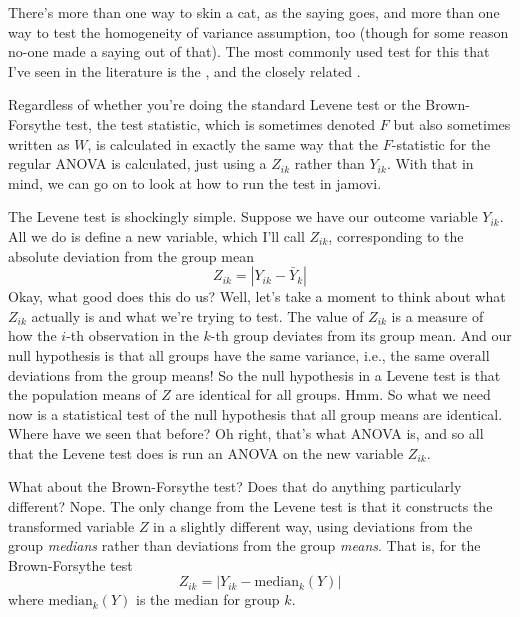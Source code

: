 There's more than one way to skin a cat, as the saying goes, and more than one way to test the homogeneity of variance assumption, too (though for some reason no-one made a saying out of that). The most commonly used test for this that I've seen in the literature is the  \parencite{Levene1960}, and the closely related  \parencite{BrownForsythe1974}. 

Regardless of whether you're doing the standard Levene test or the Brown-Forsythe test, the test statistic, which is sometimes denoted $F$ but also sometimes written as $W$, is  calculated in exactly the same way that the $F$-statistic for the regular ANOVA is calculated, just using a $Z_{ik}$ rather than $Y_{ik}$. With that in mind, we can go on to look at how to run the test in jamovi.

\vspace{0.5cm}
\begin{mdframed}[style=MyFrame,nobreak=false]
The Levene test is shockingly simple. Suppose we have our outcome variable $Y_{ik}$. All we do is define a new variable, which I'll call $Z_{ik}$, corresponding to the absolute deviation from the group mean
$$
Z_{ik} = \left| Y_{ik} - \bar{Y}_k \right|
$$
Okay, what good does this do us? Well, let's take a moment to think about what $Z_{ik}$ actually is and what we're trying to test. The value of $Z_{ik}$ is a measure of how the $i$-th observation in the $k$-th group deviates from its group mean. And our null hypothesis is that all groups have the same variance, i.e., the same overall deviations from the group means! So the null hypothesis in a Levene test is that the population means of $Z$ are identical for all groups. Hmm. So what we need now is a statistical test of the null hypothesis that all group means are identical. Where have we seen that before? Oh right, that's what ANOVA is, and so all that the Levene test does is run an ANOVA on the new variable $Z_{ik}$. 

What about the Brown-Forsythe test? Does that do anything particularly different? Nope. The only change from the Levene test is that it constructs the transformed variable $Z$ in a slightly different way, using deviations from the group {\it medians} rather than deviations from the group {\it means}. That is, for the Brown-Forsythe test 
$$
Z_{ik} = \left| Y_{ik} - \mbox{median}_k(Y) \right|
$$
where $\mbox{median}_k(Y)$ is the median for group $k$. 
\end{mdframed}


